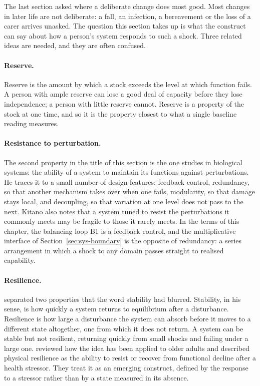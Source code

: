 The last section asked where a deliberate change does most good. Most changes
in later life are not deliberate: a fall, an infection, a bereavement or the
loss of a carer arrives unasked. The question this section takes up is what
the construct can say about how a person's system responds to such a shock.
Three related ideas are needed, and they are often confused.

\paragraph{Reserve.} Reserve is the amount by which a stock exceeds the level
at which function fails. A person with ample reserve can lose a good deal of
capacity before they lose independence; a person with little reserve cannot.
Reserve is a property of the stock at one time, and so it is the property
closest to what a single baseline reading measures.

\paragraph{Resistance to perturbation.} The second property in the title of
this section is the one \citet{kitano_2004} studies in biological systems: the
ability of a system to maintain its functions against perturbations. He traces it to a small number of design features:
feedback control, redundancy, so that another mechanism takes over when one
fails, modularity, so that damage stays local, and decoupling, so that
variation at one level does not pass to the next. Kitano also notes that a
system tuned to resist the perturbations it commonly meets may be fragile to
those it rarely meets. In the terms of this chapter, the balancing loop B1 is
a feedback control, and the multiplicative interface of
Section~\ref{sec:sys-boundary} is the opposite of redundancy: a series
arrangement in which a shock to any domain passes straight to realised
capability.

\paragraph{Resilience.} \citet{holling_1973} separated two properties that
the word stability had blurred. Stability, in his sense, is how quickly a
system returns to equilibrium after a disturbance. Resilience is how large a
disturbance the system can absorb before it moves to a different state
altogether, one from which it does not return. A system can be stable but not
resilient, returning quickly from small shocks and failing under a large one.
\citet{whitson_2016} reviewed how the idea has been applied to older adults
and described physical resilience as the ability to resist or recover from
functional decline after a health stressor. They treat it as an emerging
construct, defined by the response to a stressor rather than by a state
measured in its absence.

